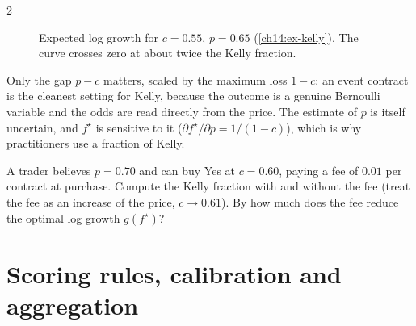 \begin{paracol}{2}
\begin{figure}[ht]
\centering
{}
\caption{Expected log growth for $c=0.55$, $p=0.65$ (\cref{ch14:ex-kelly}). The curve crosses zero at about twice the Kelly fraction.}
\label{ch14:fig-kelly}
\end{figure}

\begin{finance}
Only the gap $p-c$ matters, scaled by the maximum loss $1-c$: an event contract is the cleanest setting for Kelly, because the outcome
is a genuine Bernoulli variable and the odds are read directly from the price. The estimate of $p$ is itself uncertain, and
$f^\star$ is sensitive to it ($\partial f^\star/\partial p=1/(1-c)$), which is why practitioners use a fraction of Kelly.
\end{finance}

\begin{exercise}\label{ch14:ex-kellyfee}
A trader believes $p=0.70$ and can buy Yes at $c=0.60$, paying a fee of $0.01$ per contract at purchase. Compute the Kelly fraction with and without the fee (treat the fee as an
increase of the price, $c\to0.61$). By how much does the fee reduce the optimal log growth $g(f^\star)$?
\end{exercise}

\section{Scoring rules, calibration and aggregation}\label{ch14:sec-info}


\end{paracol}
